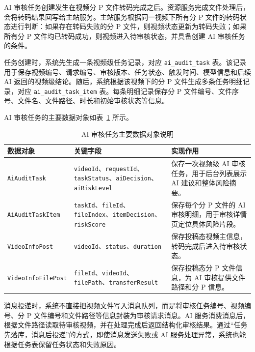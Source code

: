 AI 审核任务创建发生在视频分 P 文件转码完成之后。资源服务完成文件处理后，会将转码结果回写给主站服务。主站服务根据同一视频下所有分 P 文件的转码状态进行判断：如果存在转码失败的分 P 文件，则视频状态更新为转码失败；如果所有分 P 文件均已转码成功，则视频进入待审核状态，并具备创建 AI 审核任务的条件。

任务创建时，系统先生成一条视频级任务记录，对应 \texttt{ai\_audit\_task} 表。该记录用于保存视频编号、请求编号、审核版本、任务状态、触发时间、模型信息和后续 AI 返回的视频级结论。随后，系统根据该视频下的分 P 文件生成多条任务明细记录，对应 \texttt{ai\_audit\_task\_item} 表。每条明细记录保存分 P 文件编号、文件序号、文件名、文件路径、时长和初始审核状态等信息。

AI 审核任务的主要数据对象如表~\ref{tab:ai-audit-data-object} 所示。

\begin{table}[!htbp]
    \centering
    \caption{AI 审核任务主要数据对象说明}
    \label{tab:ai-audit-data-object}
    \begin{tabular}{p{} p{} p{}}
        \toprule
        \textbf{数据对象} & \textbf{关键字段} & \textbf{实现作用} \\
        \midrule
        \texttt{AiAuditTask}
        & \texttt{videoId}、\texttt{requestId}、\texttt{taskStatus}、\texttt{aiDecision}、\texttt{aiRiskLevel}
        & 保存一次视频级 AI 审核任务，用于后台列表展示 AI 建议和整体风险摘要。 \\

        \texttt{AiAuditTaskItem}
        & \texttt{taskId}、\texttt{fileId}、\texttt{fileIndex}、\texttt{itemDecision}、\texttt{riskScore}
        & 保存每个分 P 文件的 AI 审核明细，用于审核详情页定位具体风险片段。 \\

        \texttt{VideoInfoPost}
        & \texttt{videoId}、\texttt{status}、\texttt{duration}
        & 保存投稿态视频主信息，转码完成后进入待审核状态。 \\

        \texttt{VideoInfoFilePost}
        & \texttt{fileId}、\texttt{videoId}、\texttt{filePath}、\texttt{transferResult}
        & 保存投稿态分 P 文件信息，为 AI 审核提供文件路径和分 P 信息。 \\
        \bottomrule
    \end{tabular}
\end{table}

消息投递时，系统不直接把视频文件写入消息队列，而是将审核任务编号、视频编号、分 P 文件编号和文件路径等信息封装为审核请求消息。AI 服务消费消息后，根据文件路径读取待审核视频，并在处理完成后返回结构化审核结果。通过“任务先落库，消息后投递”的方式，即使消息发送失败或 AI 服务处理异常，系统也能根据任务表保留任务状态和失败原因。

